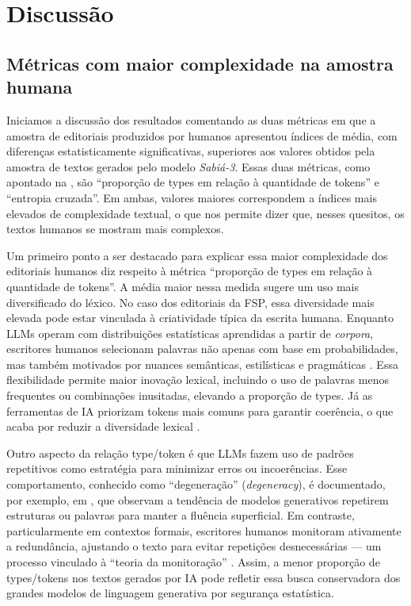 \documentclass[portuguese]{textolivre}
\begin{document}
\section{Discussão}\label{sec-discussão}

\subsection{Métricas com maior complexidade na amostra humana}\label{sec-humanos}
Iniciamos a discussão dos resultados comentando as duas métricas em que a amostra de editoriais produzidos por humanos apresentou índices de média, com diferenças estatisticamente significativas, superiores aos valores obtidos pela amostra de textos gerados pelo modelo \emph{Sabiá-3}.
Essas duas métricas, como apontado na , são ``proporção de types em relação à quantidade de tokens'' e ``entropia cruzada''.
Em ambas, valores maiores correspondem a índices mais elevados de complexidade textual, o que nos permite dizer que, nesses quesitos, os textos humanos se mostram mais complexos.

Um primeiro ponto a ser destacado para explicar essa maior complexidade dos editoriais humanos diz respeito à métrica ``proporção de types em relação à quantidade de tokens''.
A média maior nessa medida sugere um uso mais diversificado do léxico.
No caso dos editoriais da FSP, essa diversidade mais elevada pode estar vinculada à criatividade típica da escrita humana.
Enquanto LLMs operam com distribuições estatísticas aprendidas a partir de \emph{corpora}, escritores humanos selecionam palavras não apenas com base em probabilidades, mas também motivados por nuances semânticas, estilísticas e pragmáticas \cite{Piantadosi2014}.
Essa flexibilidade permite maior inovação lexical, incluindo o uso de palavras menos frequentes ou combinações inusitadas, elevando a proporção de types.
Já as ferramentas de IA priorizam tokens mais comuns para garantir coerência, o que acaba por reduzir a diversidade lexical \cite{Holtzman2020}.

Outro aspecto da relação type/token é que LLMs fazem uso de padrões repetitivos como estratégia para minimizar erros ou incoerências.
Esse comportamento, conhecido como ``degeneração'' (\emph{degeneracy}), é documentado, por exemplo, em \textcite{Welleck2019}, que observam a tendência de modelos generativos repetirem estruturas ou palavras para manter a fluência superficial.
Em contraste, particularmente em contextos formais, escritores humanos monitoram ativamente a redundância, ajustando o texto para evitar repetições desnecessárias --- um processo vinculado à ``teoria da monitoração'' \cite{Levelt1989}.
Assim, a menor proporção de types/tokens nos textos gerados por IA pode refletir essa busca conservadora dos grandes modelos de linguagem generativa por segurança estatística.
\end{document}
